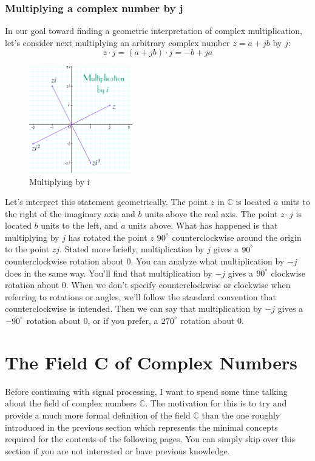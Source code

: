\documentclass[12pt,oneside,openany]{memoir}
\numberwithin{equation}{subsection}
\begin{document}
\subsubsection{Multiplying a complex number by j}
In our goal toward finding a geometric interpretation of complex multiplication, let's consider next multiplying an arbitrary complex number \(z = a + jb\) by \(j\):
\[
	z \cdot j = (a + jb) \cdot j = -b + ja
\]
\bigbreak
\begin{figure}
\centering
\captionsetup{justification=centering}
\includegraphics[width=0.4\textwidth]{images/multiply_by_i.png}
\caption{Multiplying by i}
\end{figure}
Let's interpret this statement geometrically. The point \(z\) in \(\mathbb{C}\) is located $a$ units to the right of the imaginary axis and $b$ units above the real axis. The point $z \cdot j$ is located $b$ units to the left, and $a$ units above. What has happened is that multiplying by $j$ has rotated the point $z$ $90^{\degree}$ counterclockwise around the origin to the point $zj$. Stated more briefly, multiplication by $j$ gives a $90^{\degree}$ counterclockwise rotation about 0. You can analyze what multiplication by $-j$ does in the same way. You'll find that multiplication by $-j$ gives a $90^{\degree}$ clockwise rotation about 0. When we don't specify counterclockwise or clockwise when referring to rotations or angles, we'll follow the standard convention that counterclockwise is intended. Then we can say that multiplication by $-j$ gives a $-90^{\degree}$ rotation about 0, or if you prefer, a $270^{\degree}$ rotation about 0. 


\newpage
\section{The Field C of Complex Numbers}
Before continuing with signal processing, I want to spend some time talking about the field of complex numbers $\mathbb{C}$. The motivation for this is to try and provide a much more formal definition of the field $\mathbb{C}$ than the one roughly introduced in the previous section which represents the minimal concepts required for the contents of the following pages. You can simply skip over this section if you are not interested or have previous knowledge.
\end{document}

